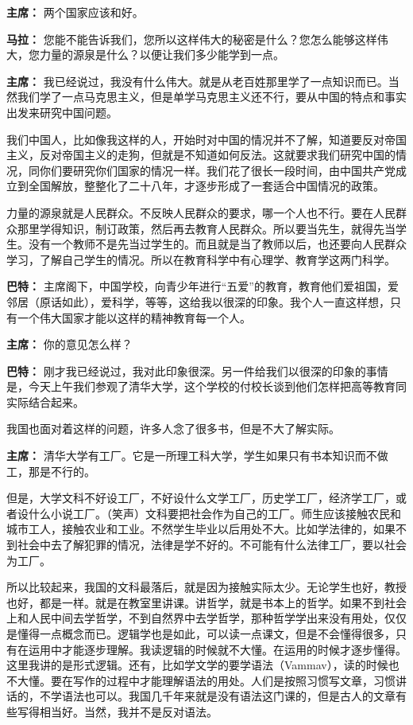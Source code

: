 \begin{list}{}
\item[\textbf{主席：}] 两个国家应该和好。

\item[\textbf{马拉：}] 您能不能告诉我们，您所以这样伟大的秘密是什么？您怎么能够这样伟大，您力量的源泉是什么？以便让我们多少能学到一点。

\item[\textbf{主席：}] 我已经说过，我没有什么伟大。就是从老百姓那里学了一点知识而已。当然我们学了一点马克思主义，但是单学马克思主义还不行，要从中国的特点和事实出发来研究中国问题。

我们中国人，比如像我这样的人，开始时对中国的情况并不了解，知道要反对帝国主义，反对帝国主义的走狗，但就是不知道如何反法。这就要求我们研究中国的情况，同你们要研究你们国家的情况一样。我们花了很长一段时间，由中国共产党成立到全国解放，整整化了二十八年，才逐步形成了一套适合中国情况的政策。

力量的源泉就是人民群众。不反映人民群众的要求，哪一个人也不行。要在人民群众那里学得知识，制订政策，然后再去教育人民群众。所以要当先生，就得先当学生。没有一个教师不是先当过学生的。而且就是当了教师以后，也还要向人民群众学习，了解自己学生的情况。所以在教育科学中有心理学、教育学这两门科学。

\item[\textbf{巴特：}] 主席阁下，中国学校，向青少年进行“五爱”的教育，教育他们爱祖国，爱邻居（原话如此），爱科学，等等，这给我以很深的印象。我个人一直这样想，只有一个伟大国家才能以这样的精神教育每一个人。

\item[\textbf{主席：}] 你的意见怎么样？

\item[\textbf{巴特：}] 刚才我已经说过，我对此印象很深。另一件给我们以很深的印象的事情是，今天上午我们参观了清华大学，这个学校的付校长谈到他们怎样把高等教育同实际结合起来。

我国也面对着这样的问题，许多人念了很多书，但是不大了解实际。

\item[\textbf{主席：}] 清华大学有工厂。它是一所理工科大学，学生如果只有书本知识而不做工，那是不行的。

但是，大学文科不好设工厂，不好设什么文学工厂，历史学工厂，经济学工厂，或者设什么小说工厂。（笑声）文科要把社会作为自己的工厂。师生应该接触农民和城市工人，接触农业和工业。不然学生毕业以后用处不大。比如学法律的，如果不到社会中去了解犯罪的情况，法律是学不好的。不可能有什么法律工厂，要以社会为工厂。

所以比较起来，我国的文科最落后，就是因为接触实际太少。无论学生也好，教授也好，都是一样。就是在教室里讲课。讲哲学，就是书本上的哲学。如果不到社会上和人民中间去学哲学，不到自然界中去学哲学，那种哲学学出来没有用处，仅仅是懂得一点概念而已。逻辑学也是如此，可以读一点课文，但是不会懂得很多，只有在运用中才能逐步理解。我读逻辑的时候就不大懂。在运用的时候才逐步懂得。这里我讲的是形式逻辑。还有，比如学文学的要学语法（Vammav），读的时候也不大懂。要在写作的过程中才能理解语法的用处。人们是按照习惯写文章，习惯讲话的，不学语法也可以。我国几千年来就是没有语法这门课的，但是古人的文章有些写得相当好。当然，我并不是反对语法。


\end{list}
